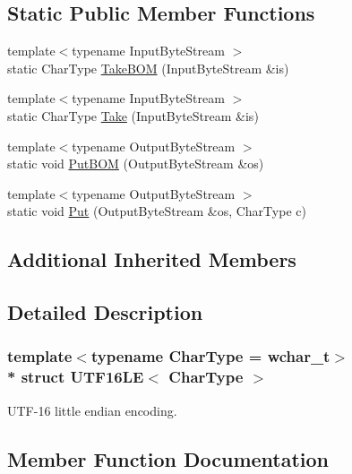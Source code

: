 \subsection*{Static Public Member Functions}
\begin{DoxyCompactItemize}
\item 
{\footnotesize template$<$typename Input\+Byte\+Stream $>$ }\\static Char\+Type \hyperlink{structUTF16LE_ab1d5f43903815155796733f76b21deea}{Take\+B\+OM} (Input\+Byte\+Stream \&is)
\item 
{\footnotesize template$<$typename Input\+Byte\+Stream $>$ }\\static Char\+Type \hyperlink{structUTF16LE_a5927b3d75ff9ce02056d827c14bd0160}{Take} (Input\+Byte\+Stream \&is)
\item 
{\footnotesize template$<$typename Output\+Byte\+Stream $>$ }\\static void \hyperlink{structUTF16LE_a6bfd05f8cac35c1594c7fce47009f198}{Put\+B\+OM} (Output\+Byte\+Stream \&os)
\item 
{\footnotesize template$<$typename Output\+Byte\+Stream $>$ }\\static void \hyperlink{structUTF16LE_ac018cc43a1dba5a6ca232bd9a257072c}{Put} (Output\+Byte\+Stream \&os, Char\+Type c)
\end{DoxyCompactItemize}
\subsection*{Additional Inherited Members}


\subsection{Detailed Description}
\subsubsection*{template$<$typename Char\+Type = wchar\+\_\+t$>$\\*
struct U\+T\+F16\+L\+E$<$ Char\+Type $>$}

U\+T\+F-\/16 little endian encoding. 

\subsection{Member Function Documentation}
